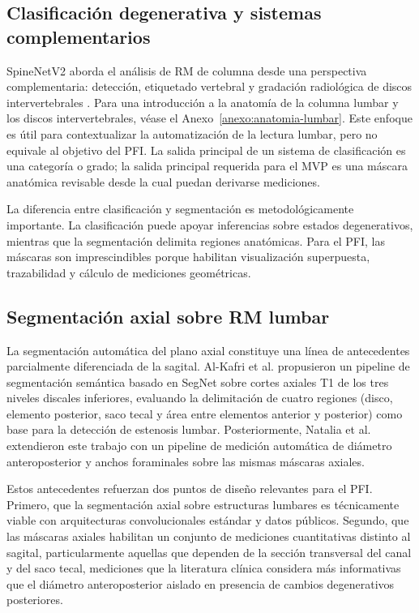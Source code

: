 \subsection{Clasificación degenerativa y sistemas complementarios}

SpineNetV2 aborda el análisis de RM de columna desde una perspectiva complementaria: detección, etiquetado vertebral y gradación radiológica de discos intervertebrales \parencite{jamaludin_spinenet_2017,windsor_spinenet_2024}. Para una introducción a la anatomía de la columna lumbar y los discos intervertebrales, véase el Anexo~\ref{anexo:anatomia-lumbar}. Este enfoque es útil para contextualizar la automatización de la lectura lumbar, pero no equivale al objetivo del PFI. La salida principal de un sistema de clasificación es una categoría o grado; la salida principal requerida para el MVP es una máscara anatómica revisable desde la cual puedan derivarse mediciones.

La diferencia entre clasificación y segmentación es metodológicamente importante. La clasificación puede apoyar inferencias sobre estados degenerativos, mientras que la segmentación delimita regiones anatómicas. Para el PFI, las máscaras son imprescindibles porque habilitan visualización superpuesta, trazabilidad y cálculo de mediciones geométricas.

\subsection{Segmentación axial sobre RM lumbar}

La segmentación automática del plano axial constituye una línea de antecedentes parcialmente diferenciada de la sagital. Al-Kafri et al. \parencite{alkafri_sudirman_boundary_2019} propusieron un pipeline de segmentación semántica basado en SegNet sobre cortes axiales T1 de los tres niveles discales inferiores, evaluando la delimitación de cuatro regiones (disco, elemento posterior, saco tecal y área entre elementos anterior y posterior) como base para la detección de estenosis lumbar. Posteriormente, Natalia et al. \parencite{natalia_measurement_2020} extendieron este trabajo con un pipeline de medición automática de diámetro anteroposterior y anchos foraminales sobre las mismas máscaras axiales.

Estos antecedentes refuerzan dos puntos de diseño relevantes para el PFI. Primero, que la segmentación axial sobre estructuras lumbares es técnicamente viable con arquitecturas convolucionales estándar y datos públicos. Segundo, que las máscaras axiales habilitan un conjunto de mediciones cuantitativas distinto al sagital, particularmente aquellas que dependen de la sección transversal del canal y del saco tecal, mediciones que la literatura clínica considera más informativas que el diámetro anteroposterior aislado en presencia de cambios degenerativos posteriores.

